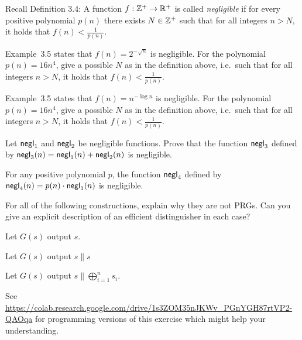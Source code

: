 \documentclass[a4paper,10pt,landscape,twocolumn]{scrartcl}
\begin{document}
\begin{exercise}
Recall Definition 3.4: A function $f: \mathbb{Z}^+ \rightarrow \mathbb{R}^+$ is called \emph{negligible} if for
every positive polynomial $p(n)$ there exists $N \in \mathbb{Z}^+$ such that for all integers $n> N$, it holds that $f(n) < \frac{1}{p(n)}$.

\begin{subex}
Example~3.5 states that $f(n) = 2^{-\sqrt{n}}$ is negligible. For the polynomial $p(n)=16 n^4$, give a possible $N$ as in the definition above, i.e.\ such that for all integers $n > N$, it holds that $f(n) < \frac{1}{p(n)}$.
\end{subex}

\begin{subex}
Example~3.5 states that $f(n) = n^{-\log{n}}$ is negligible. For the polynomial $p(n)=16 n^4$, give a possible $N$ as in the definition above, i.e.\ such that for all integers $n > N$, it holds that $f(n) < \frac{1}{p(n)}$.
\end{subex}

\begin{subex**}
Let $\mathsf{negl}_1$ and $\mathsf{negl}_2$ be negligible functions. Prove that the function $\mathsf{negl}_3$ defined by $\mathsf{negl}_3(n) = \mathsf{negl}_1(n)+\mathsf{negl}_2(n)$ is negligible.
\end{subex**}

\begin{subex**}
For any positive polynomial $p$, the function $\mathsf{negl}_4$ defined
  by $\mathsf{negl}_4(n) = p(n) \cdot \mathsf{negl}_1(n)$ is negligible.
\end{subex**}

\end{exercise}

\pagebreak
\begin{exercise}
For all of the following constructions, explain why they are not PRGs.
Can you give an explicit description of an efficient distinguisher in
each case?

\begin{subex}
Let $G(s)$ output $s$.
\end{subex}

\begin{subex}
Let $G(s)$ output $s \| s$
\end{subex}

\begin{subex}
Let $G(s)$ output $s \| \bigoplus_{i=1}^n s_i$.
\end{subex}

See
\url{https://colab.research.google.com/drive/1s3ZOM35nJKWv_PGnYGH87rtVP2-QAOqa}
for programming versions of this exercise which might help your understanding.
\end{exercise}
\end{document}
